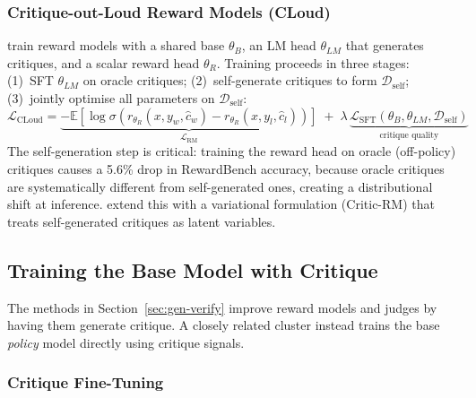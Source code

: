 \documentclass[11pt]{article}
\begin{document}
\subsubsection{Critique-out-Loud Reward Models (CLoud)}
\label{sec:cloud}

\autocite{ankner2024critiqueoutloudrewardmodels} train reward models with a shared base $\theta_B$, an LM head $\theta_{LM}$ that generates critiques, and a scalar reward head $\theta_R$. Training proceeds in three stages: (1)~SFT $\theta_{LM}$ on oracle critiques; (2)~self-generate critiques to form $\mathcal{D}_{\text{self}}$; (3)~jointly optimise all parameters on $\mathcal{D}_{\text{self}}$:
\begin{equation}
    \mathcal{L}_{\text{CLoud}} = \underbrace{-\mathbb{E}\!\left[\log\sigma\!\left(r_{\theta_R}(x, y_w, \hat{c}_w) - r_{\theta_R}(x, y_l, \hat{c}_l)\right)\right]}_{\mathcal{L}_{\text{RM}}} \;+\; \lambda\,\underbrace{\mathcal{L}_{\text{SFT}}(\theta_B, \theta_{LM}, \mathcal{D}_{\text{self}})}_{\text{critique quality}}
    \label{eq:cloud}
\end{equation}
The self-generation step is critical: training the reward head on oracle (off-policy) critiques causes a 5.6\% drop in RewardBench accuracy, because oracle critiques are systematically different from self-generated ones, creating a distributional shift at inference. \autocite{yu2025selfgeneratedcritiquesboostreward} extend this with a variational formulation (Critic-RM) that treats self-generated critiques as latent variables.

\subsection{Training the Base Model with Critique}
\label{sec:base-critique}
The methods in Section~\ref{sec:gen-verify} improve reward models and judges by having them generate critique. A closely related cluster instead trains the base \emph{policy} model directly using critique signals.

\subsubsection{Critique Fine-Tuning}
\end{document}
